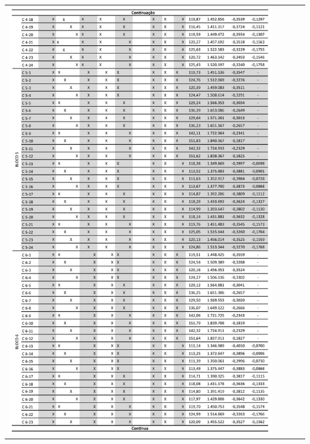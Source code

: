 \begin{table}[H]
    \centering
    \begin{tabular}{l}
        \includegraphics[width=0.9\textwidth]{figures/appendices/tabela06.png}
    \end{tabular}
\end{table}
\pagebreak
